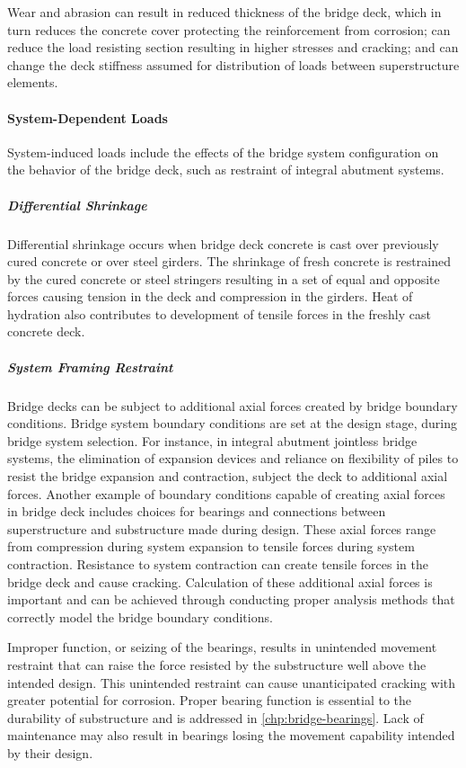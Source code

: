 Wear and abrasion can result in reduced thickness of the bridge deck, which in turn reduces the concrete cover protecting the reinforcement from corrosion; can reduce the load resisting section resulting in higher stresses and cracking; and can change the deck stiffness assumed for distribution of loads between superstructure elements.


\paragraph{System-Dependent Loads}
System-induced loads include the effects of the bridge system configuration on the behavior of the bridge deck, such as restraint of integral abutment systems.

\subparagraph*{Differential Shrinkage}
Differential shrinkage occurs when bridge deck concrete is cast over previously cured concrete or over steel girders. The shrinkage of fresh concrete is restrained by the cured concrete or steel stringers resulting in a set of equal and opposite forces causing tension in the deck and compression in the girders. Heat of hydration also contributes to development of tensile forces in the freshly cast concrete deck.
\subparagraph*{System Framing Restraint}
Bridge decks can be subject to additional axial forces created by bridge boundary conditions. Bridge system boundary conditions are set at the design stage, during bridge system selection. For instance, in integral abutment jointless bridge systems, the elimination of expansion devices and reliance on flexibility of piles to resist the bridge expansion and contraction, subject the deck to additional axial forces. Another example of boundary conditions capable of creating axial forces in bridge deck includes choices for bearings and connections between superstructure and substructure made during design. These axial forces range from compression during system expansion to tensile forces during system contraction. Resistance to system contraction can create tensile forces in the bridge deck and cause cracking. Calculation of these additional axial forces is important and can be achieved through conducting proper analysis methods that correctly model the bridge boundary conditions.

Improper function, or seizing of the bearings, results in unintended movement restraint that can raise the force resisted by the substructure well above the intended design. This unintended restraint can cause unanticipated cracking with greater potential for corrosion. Proper bearing function is essential to the durability of substructure and is addressed in \cref{chp:bridge-bearings}. Lack of maintenance may also result in bearings losing the movement capability intended by their design.

